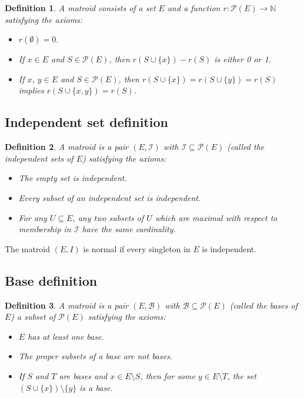 \documentclass[12pt]{article}
\newtheorem{definition}{Definition}
\begin{document}
\begin{definition}
A matroid consists of a set $E$ and a function $r\colon\mathcal{P}(E)\to\mathbb{N}$ satisfying the axioms:

\begin{itemize}
\item[q1] $r(\emptyset)=0$.
\item[q2] If $x\in E$ and $S\in\mathcal{P}(E)$, then $r(S\cup\{x\})-r(S)$ is either 0 or 1.
\item[q3] If $x$, $y\in E$ and $S\in\mathcal{P}(E)$, then
$r(S\cup\{x\})=r(S\cup\{y\})=r(S)$ implies $r(S\cup\{x,y\})=r(S)$.
\end{itemize}
\end{definition}

\subsection*{Independent set definition}

\begin{definition}
A matroid is a pair $(E,\mathcal{I})$ with $\mathcal{I}\subseteq\mathcal{P}(E)$ (called the {\em independent sets} of $E$) satisfying the axioms:

\begin{itemize}
\item[i1] The empty set is independent.
\item[i2] Every subset of an independent set is independent.
\item[i3] For any $U\subseteq E$, any two subsets of $U$ which are maximal with respect to membership in $\mathcal{I}$ have the same cardinality.
\end{itemize}
\end{definition}

The matroid $(E,I)$ is normal if every singleton in $E$ is independent.

\subsection*{Base definition}

\begin{definition}
A matroid is a pair $(E,\mathcal{B})$ with $\mathcal{B}\subseteq\mathcal{P}(E)$ (called the {\em bases} of $E$) a subset of $\mathcal{P}(E)$ satisfying the axioms:

\begin{itemize}
\item[b1] $E$ has at least one base.
\item[b2] The proper subsets of a base are not bases.
\item[b3] If $S$ and $T$ are bases and $x\in E\setminus S$, then for some $y\in E\setminus T$, the set $(S\cup\{x\})\setminus\{y\}$ is a base.
\end{itemize}
\end{definition}
\end{document}
